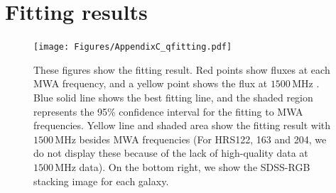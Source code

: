\documentclass[12pt,a4paper,oneside,openright,final,titlepage]{report}
\newcommand{\MHz}{\,\mathrm{MHz}}
\begin{document}
\chapter{Fitting results}\label{chap:fittingresults}
\begin{figure}[htbp]
    \centering
    \texttt{[image: Figures/AppendixC\_qfitting.pdf]}
    \caption[Fitting results for 18 samples]{\label{fig:fittingresults}
        These figures show the fitting result.
        Red points show fluxes at each MWA frequency, and a yellow point shows the flux at $1500\MHz$ \citep{Boselli2015}.
        Blue solid line shows the best fitting line, and the shaded region represents the 95\% confidence interval for the fitting to MWA frequencies.
        Yellow line and shaded area show the fitting result with $1500\MHz$ besides MWA frequencies (For HRS122, 163 and 204, we do not display these because of the lack of high-quality data at $1500\MHz$ data).
        On the bottom right, we show the SDSS-RGB stacking image for each galaxy.
    }
\end{figure}
\end{document}
